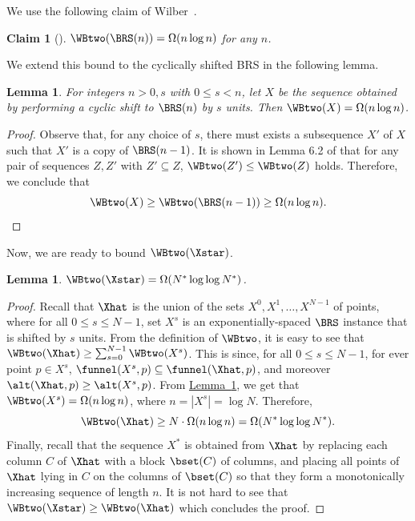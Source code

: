 \documentclass[11pt]{article}
\numberwithin{equation}{section}
\newtheorem{lemma}[theorem]{Lemma}
\newtheorem{claim}[theorem]{Claim}
\theoremstyle{definition}
\theoremstyle{plain}
\newcommand{\expref}[2]{\hyperref[#2]{#1~\ref{#2}}}
\begin{document}
We use the following claim of Wilber~\cite{wilber}. %
%
\begin{claim}
[\cite{wilber}]$\WBtwo(\BRS(n))=\Omega(n\log n)$ for any $n$.
\end{claim}

We extend this bound to the cyclically shifted BRS in the following lemma.
\begin{lemma}
\label{lem:shifted BRS} For integers $n>0,s$ with  $0\leq s<n$, let $X$ be the sequence obtained by performing
a cyclic shift to $\BRS(n)$ by $s$ units. Then $\WBtwo(X)=\Omega(n\log n)$. 
\end{lemma}

\begin{proof}
Observe that, for any choice of $s$, there must exists
a subsequence $X'$ of $X$ such that $X'$ is a copy of $\BRS(n-1)$. It is shown in Lemma 6.2 of \cite{LevyT19}
that for any pair of sequences $Z,Z'$ with $Z'\subseteq Z$, $\WBtwo(Z')\le\WBtwo(Z)$ holds. Therefore, we conclude that
\[
\WBtwo(X)\ge\WBtwo(\BRS(n-1))\ge \Omega(n\log n).
\]
\end{proof}





Now, we are ready to bound  $\WBtwo(\Xstar)$.

\begin{lemma}
$\WBtwo(\Xstar)=\Omega(N^{*}\log\log N^{*})$.
\end{lemma}

\begin{proof}
Recall that $\Xhat$ is the union of the sets $X^{0},X^{1},\dots,X^{N-1}$ of points, where for all $0\leq s\leq N-1$, set $X^{s}$ is an exponentially-spaced $\BRS$ instance that is shifted
by $s$ units. From the definition
of $\WBtwo$, it is easy to see that $\WBtwo(\Xhat)\ge\sum_{s=0}^{N-1}\WBtwo(X^{s})$. This is since, for all $0\leq s\leq N-1$, for ever point $p\in X^{s}$, $\funnel(X^s,p)\subseteq \funnel(\Xhat, p)$, and moreover $\alt(\Xhat,p)\geq \alt(X^s,p)$.
From \expref{Lemma}{lem:shifted BRS}, we get that $\WBtwo(X^{s})=\Omega(n\log n)$, where $n=|X^s|=\log N$. Therefore,
\[
\WBtwo(\Xhat)\ge N\cdot\Omega(n\log n)=\Omega(N^{*}\log\log N^{*}).
\]
Finally, recall that the sequence $X^{*}$ is obtained from $\Xhat$
by replacing each column $C$ of $\Xhat$ with a block $\bset(C)$ of columns, and placing all points of $\Xhat$ lying in $C$ on the columns of $\bset(C)$ so that they form a monotonically increasing sequence of length $n$. It is not hard to see that $\WBtwo(\Xstar)\ge\WBtwo(\Xhat)$
which concludes the proof.
\end{proof}
\end{document}
